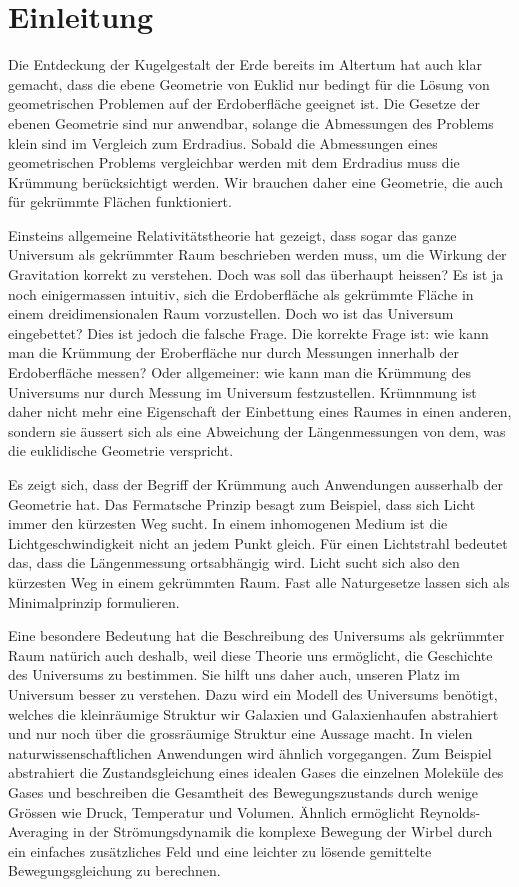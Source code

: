 %
%
%
\chapter*{Einleitung\label{chapter:einleitung}}
\rhead{}
Die Entdeckung der Kugelgestalt der Erde bereits im Altertum hat auch
klar gemacht, dass die ebene Geometrie von Euklid nur bedingt für
die Lösung von geometrischen Problemen auf der Erdoberfläche geeignet
ist.
Die Gesetze der ebenen Geometrie sind nur anwendbar, solange 
die Abmessungen des Problems klein sind im Vergleich zum Erdradius.
Sobald die Abmessungen eines geometrischen Problems vergleichbar werden
mit dem Erdradius muss die Krümmung berücksichtigt werden.
Wir brauchen daher eine Geometrie, die auch für gekrümmte Flächen
funktioniert.

Einsteins allgemeine Relativitätstheorie hat gezeigt, dass sogar das
ganze Universum als gekrümmter Raum beschrieben werden muss, um die 
Wirkung der Gravitation korrekt zu verstehen.
Doch was soll das überhaupt heissen?
Es ist ja noch einigermassen intuitiv, sich die Erdoberfläche
als gekrümmte Fläche in einem dreidimensionalen Raum vorzustellen.
Doch wo ist das Universum eingebettet?
Dies ist jedoch die falsche Frage.
Die korrekte Frage ist: wie kann man die Krümmung der Eroberfläche
nur durch Messungen innerhalb der Erdoberfläche messen?
Oder allgemeiner: wie kann man die Krümmung des Universums nur durch
Messung im Universum festzustellen.
Krümnmung ist daher nicht mehr eine Eigenschaft der Einbettung eines
Raumes in einen anderen, sondern sie äussert sich als eine Abweichung
der Längenmessungen von dem, was die euklidische Geometrie verspricht.

Es zeigt sich, dass der Begriff der Krümmung auch Anwendungen ausserhalb
der Geometrie hat.
Das Fermatsche Prinzip besagt zum Beispiel, dass sich Licht immer
den kürzesten Weg sucht.
In einem inhomogenen Medium ist die Lichtgeschwindigkeit nicht
an jedem Punkt gleich.
Für einen Lichtstrahl bedeutet das, dass die Längenmessung ortsabhängig wird.
Licht sucht sich also den kürzesten Weg in einem gekrümmten Raum.
Fast alle Naturgesetze lassen sich als Minimalprinzip formulieren.

Eine besondere Bedeutung hat die Beschreibung des Universums als gekrümmter
Raum natürich auch deshalb, weil diese Theorie uns ermöglicht,
die Geschichte des Universums zu bestimmen.
Sie hilft uns daher auch, unseren Platz im Universum besser zu
verstehen.
Dazu wird ein Modell des Universums benötigt, welches die kleinräumige
Struktur wir Galaxien und Galaxienhaufen abstrahiert und nur noch
über die grossräumige Struktur eine Aussage macht.
In vielen naturwissenschaftlichen Anwendungen wird ähnlich vorgegangen.
Zum Beispiel abstrahiert die Zustandsgleichung eines idealen Gases
die einzelnen Moleküle des Gases und beschreiben die Gesamtheit des
Bewegungszustands durch wenige Grössen wie Druck, Temperatur und Volumen.
Ähnlich ermöglicht Reynolds-Averaging in der Strömungsdynamik die 
komplexe Bewegung der Wirbel durch ein einfaches zusätzliches Feld und
eine leichter zu lösende gemittelte Bewegungsgleichung zu berechnen.

